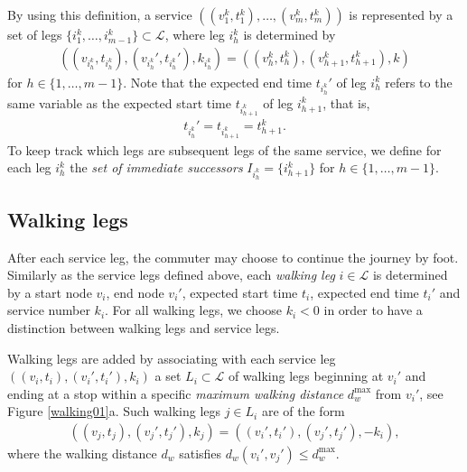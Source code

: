 \documentclass[dissertation,draft*]{aaltoseries}
\begin{document}

By using this definition, a service  $((v_1^k, t_1^k), \ldots, (v_m^k, t_m^k))$ is
represented by a set of legs ${\{i_1^k,\ldots,i_{m-1}^k\} \subset \mathcal{L}}$, where leg $i_h^k$
is determined by 
\begin{align}
\label{legdefinition}
\left( (v_{i_h^k}, t_{i_h^k}), (v_{i_h^k}', t_{i_h^k}'),k_{i_h^k} \right) 
= \left((v_{h}^k, t_{h}^k),(v_{h+1}^k, t_{h+1}^k),k \right)
\end{align}
for $h \in \{1,\ldots , m-1\}$. 
Note that the expected end time $t_{i_h^k}'$ of leg $i_h^k$ refers to 
the same variable as the expected start time $t_{i_{h+1}^k}$ of leg $i_{h+1}^k$, that is,
\begin{align*} 
t_{i_h^k}' = t_{i_{h+1}^k} = t_{h+1}^k.
\end{align*} 
To keep track which legs are subsequent
legs of the same service, we define for each leg $i_h^k$ the \emph{set
of immediate successors} $I_{i_h^k} = \{ i_{h+1}^k\}$ for $h \in \{1,\ldots , m-1\}$.


\subsection{Walking legs}
After each service leg, the commuter may choose to continue the journey by foot. 
Similarly as the service legs defined above, each \emph{walking leg} $i \in \mathcal{L}$ 
is determined by a start node $v_i$, end node $v_i'$, expected start time $t_i$, expected end time $t_i'$ 
and service number $k_i$. For all walking legs, we choose $k_i < 0$ in order to have a distinction 
between walking legs and service legs.

Walking legs are added by associating with each service leg $((v_i, t_i), (v_i', t_i'),k_i)$ a set 
$L_i \subset \mathcal{L}$ of walking legs beginning at $v_i'$ and ending at a stop within a specific 
\emph{maximum walking distance} $d_w^{\max }$ from $v_i'$, see Figure \ref{walking01}a. Such walking legs $j \in L_i$
are of the form
\begin{align*}
\left((v_j, t_j), (v_j', t_j'),k_j\right)=\left( (v_i', t_i'),(v_j',t_j'),-k_i \right),
\end{align*}
where the walking distance $d_w$ satisfies $d_w(v_i',v_j') \leq d_w^{\max }$. 
\end{document}
